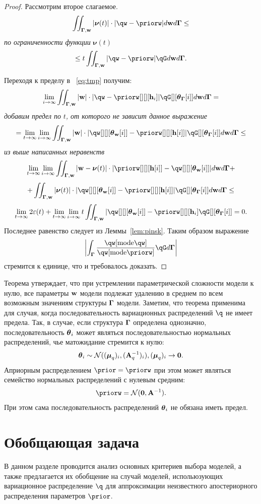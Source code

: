 \begin{proof}
Рассмотрим второе слагаемое.
$$
\iint_{\G,\w} |\boldsymbol{\nu}(t)|\cdot |\qw - \priorw| d\w d\G \leq 
$$
\textit{по ограниченности функции }$\boldsymbol{\nu}(t)$
$$
  \leq  t \iint_{\G,\w}  |\qw - \priorw|\qG d\w d\G.
$$

Переходя к пределу в ~\eqref{eq:tmp} получим:
$$
    \lim_{i \to \infty} \iint_{\G,\w} |\w| \cdot |\qw - \priorw[][][\h_i]|\qG[][{\tetaG[i]}] d\w d\G  =
$$
\textit{добавим предел по }$t$\textit{, от которого не зависит данное выражение}
$$
= \lim_{t \to \infty}\lim_{i \to \infty}\iint_{\G,\w} |\w|\cdot |\qw[][][{\tetaw[i]}] - \priorw[][][{\h[i]}]|\qG[][{\tetaG[i]}] d\w d\G \leq
$$
\textit{из выше написанных неравенств}
$$
    \lim_{t \to \infty}\lim_{i \to \infty} \iint_{\G,\w} |\w -\boldsymbol{\nu}(t)|\cdot|\priorw[][][{\h[i]}] -\qw[][][{\tetaw[i]}]| d\w d\G   +
$$
$$
 + \iint_{\G,\w} |\boldsymbol{\nu}(t)| \cdot |\qw[][][{\tetaw[i]}] - \priorw[][][{\h[i]}]|\qG[][{\tetaG[i]}] d\w d\G \leq
$$
$$
     \lim_{t \to \infty}  2\varepsilon(t)  + \lim_{t \to \infty}\lim_{i \to \infty}  t \iint_{\G,\w}  |\qw[][][{\tetaw[i]}] - \priorw[][][\h_i]\qG[][{\tetaG[i]}] = 0.
$$
Последнее равенство следует из Леммы~\ref{lem:pinsk}.
Таким образом выражение $$\left|\int_{\G} \frac{\qw[\text{mode}\qw]}{\qw[\text{mode}\priorw]}\qG d\G \right|$$ стремится к единице, что и требовалось доказать.
\end{proof}

Теорема утверждает, что при устремлении параметрической сложности модели к нулю, все параметры $\mathbf{w}$  модели подлежат удалению в среднем по всем возможным значениям  структуры $\boldsymbol{\Gamma}$ модели. Заметим, что теорема применима для случая, когда последовательность вариационных распределений $\q$ не имеет предела. Так, в случае, если структура $\boldsymbol{\Gamma}$ определена однозначно, последовательность $\boldsymbol{\theta}_i$ может являться последовательностью нормальных распределений, чье матожидание стремится к нулю:
\[
    \boldsymbol{\theta}_i \sim \mathcal{N}((\boldsymbol{\mu}_q)_i, (\mathbf{A}^{-1}_q)_i), (\boldsymbol{\mu}_q)_i \to \mathbf{0}.
\]
Априорным распределением $\prior = \priorw$ при этом может являться семейство нормальных распределений с нулевым средним:
\[
    \priorw = \mathcal{N}(\mathbf{0}, \A^{-1}).
\]
При этом сама последовательность распределений $\boldsymbol{\theta}_i$ не обязана иметь предел.

\section{Обобщающая задача}
В данном разделе проводится анализ основных критериев выбора моделей, а также предлагается их обобщение на случай моделей, испольюзующих вариационное распределение $\q$ для аппроксимации неизвестного апостериорного распределения параметров $\prior$.


